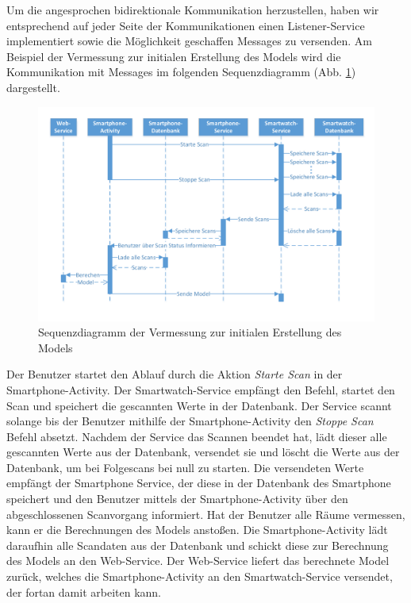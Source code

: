 Um die angesprochen bidirektionale Kommunikation herzustellen, haben wir entsprechend auf jeder Seite der Kommunikationen einen Listener-Service implementiert sowie die Möglichkeit geschaffen Messages zu versenden. Am Beispiel der Vermessung zur initialen Erstellung des Models wird die Kommunikation mit Messages im folgenden Sequenzdiagramm (Abb. \ref{fig:SequenzdiagrammScan}) dargestellt.

\begin{figure}[H]
\centering
\includegraphics[width=1\linewidth]{../Bilder/SequenzdiagrammScan}
\caption{Sequenzdiagramm der Vermessung zur initialen Erstellung des Models}
\label{fig:SequenzdiagrammScan}
\end{figure}

Der Benutzer startet den Ablauf durch die Aktion \textit{Starte Scan} in der Smartphone-Activity. Der Smartwatch-Service empfängt den Befehl, startet den Scan und speichert die gescannten Werte in der Datenbank. Der Service scannt solange bis der Benutzer mithilfe der Smartphone-Activity den \textit{Stoppe Scan} Befehl absetzt. Nachdem der Service das Scannen beendet hat, lädt dieser alle gescannten Werte aus der Datenbank, versendet sie und löscht die Werte aus der Datenbank, um bei Folgescans bei null zu starten. Die versendeten Werte empfängt der Smartphone Service, der diese in der Datenbank des Smartphone speichert und den Benutzer mittels der Smartphone-Activity über den abgeschlossenen Scanvorgang informiert. Hat der Benutzer alle Räume vermessen, kann er die Berechnungen des Models anstoßen. Die Smartphone-Activity lädt daraufhin alle Scandaten aus der Datenbank und schickt diese zur Berechnung des Models an den Web-Service. Der Web-Service liefert das berechnete Model zurück, welches die Smartphone-Activity an den Smartwatch-Service versendet, der fortan damit arbeiten kann.

